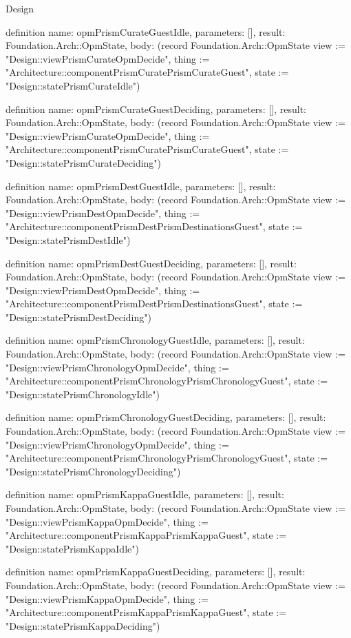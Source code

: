\begin{lexlean}{Design}
\begin{semanticmodule}
definition{
  name: opmPrismCurateGuestIdle,
  parameters: [],
  result: Foundation.Arch::OpmState,
  body: (record Foundation.Arch::OpmState {view := "Design::viewPrismCurateOpmDecide", thing := "Architecture::componentPrismCuratePrismCurateGuest", state := "Design::statePrismCurateIdle"})
}

definition{
  name: opmPrismCurateGuestDeciding,
  parameters: [],
  result: Foundation.Arch::OpmState,
  body: (record Foundation.Arch::OpmState {view := "Design::viewPrismCurateOpmDecide", thing := "Architecture::componentPrismCuratePrismCurateGuest", state := "Design::statePrismCurateDeciding"})
}

definition{
  name: opmPrismDestGuestIdle,
  parameters: [],
  result: Foundation.Arch::OpmState,
  body: (record Foundation.Arch::OpmState {view := "Design::viewPrismDestOpmDecide", thing := "Architecture::componentPrismDestPrismDestinationsGuest", state := "Design::statePrismDestIdle"})
}

definition{
  name: opmPrismDestGuestDeciding,
  parameters: [],
  result: Foundation.Arch::OpmState,
  body: (record Foundation.Arch::OpmState {view := "Design::viewPrismDestOpmDecide", thing := "Architecture::componentPrismDestPrismDestinationsGuest", state := "Design::statePrismDestDeciding"})
}

definition{
  name: opmPrismChronologyGuestIdle,
  parameters: [],
  result: Foundation.Arch::OpmState,
  body: (record Foundation.Arch::OpmState {view := "Design::viewPrismChronologyOpmDecide", thing := "Architecture::componentPrismChronologyPrismChronologyGuest", state := "Design::statePrismChronologyIdle"})
}

definition{
  name: opmPrismChronologyGuestDeciding,
  parameters: [],
  result: Foundation.Arch::OpmState,
  body: (record Foundation.Arch::OpmState {view := "Design::viewPrismChronologyOpmDecide", thing := "Architecture::componentPrismChronologyPrismChronologyGuest", state := "Design::statePrismChronologyDeciding"})
}

definition{
  name: opmPrismKappaGuestIdle,
  parameters: [],
  result: Foundation.Arch::OpmState,
  body: (record Foundation.Arch::OpmState {view := "Design::viewPrismKappaOpmDecide", thing := "Architecture::componentPrismKappaPrismKappaGuest", state := "Design::statePrismKappaIdle"})
}

definition{
  name: opmPrismKappaGuestDeciding,
  parameters: [],
  result: Foundation.Arch::OpmState,
  body: (record Foundation.Arch::OpmState {view := "Design::viewPrismKappaOpmDecide", thing := "Architecture::componentPrismKappaPrismKappaGuest", state := "Design::statePrismKappaDeciding"})
}


\end{semanticmodule}
\end{lexlean}
